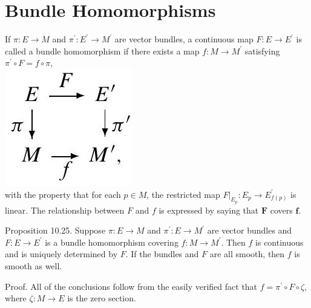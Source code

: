 \documentclass[10pt]{article}
\begin{document}
\section*{Bundle Homomorphisms}
If $\pi: E \rightarrow M$ and $\pi^{\prime}: E^{\prime} \rightarrow M^{\prime}$ are vector bundles, a continuous map $F: E \rightarrow E^{\prime}$ is called a bundle homomorphism if there exists a map $f: M \rightarrow M^{\prime}$ satisfying $\pi^{\prime} \circ F=f \circ \pi$,\\
\includegraphics[max width=\textwidth, center]{2025_06_03_90f64b1a1e243cccc2e0g-279}\\
with the property that for each $p \in M$, the restricted map $\left.F\right|_{E_{p}}: E_{p} \rightarrow E_{f(p)}^{\prime}$ is linear. The relationship between $F$ and $f$ is expressed by saying that $\boldsymbol{F}$ covers $\boldsymbol{f}$.

Proposition 10.25. Suppose $\pi: E \rightarrow M$ and $\pi^{\prime}: E \rightarrow M^{\prime}$ are vector bundles and $F: E \rightarrow E^{\prime}$ is a bundle homomorphism covering $f: M \rightarrow M^{\prime}$. Then $f$ is continuous and is uniquely determined by $F$. If the bundles and $F$ are all smooth, then $f$ is smooth as well.

Proof. All of the conclusions follow from the easily verified fact that $f=\pi^{\prime} \circ F \circ \zeta$, where $\zeta: M \rightarrow E$ is the zero section.
\end{document}

